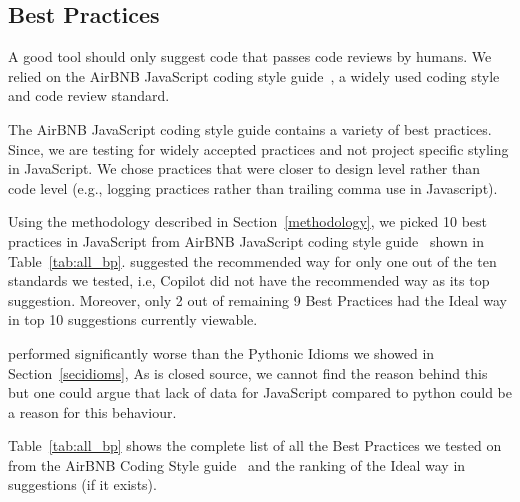 \subsection{Best Practices}
\label{bp}
A good \AISE{} tool should only suggest code that passes code reviews by humans. We relied on the AirBNB JavaScript coding style guide~\cite{airbnb_code}, a widely used coding style and code review standard. 

The AirBNB JavaScript coding style guide contains a variety of best practices. 
Since, we are testing \cop{} for widely accepted practices and not project specific styling in JavaScript. We chose practices that were closer to design level rather than code level (e.g., logging practices rather than trailing comma use in Javascript).

Using the methodology described in Section~\ref{methodology}, we picked 10 best practices in JavaScript from AirBNB JavaScript coding style guide~\cite{airbnb_code} shown in Table~\ref{tab:all_bp}. \cop{} suggested the recommended way for only one out of the ten standards we tested, i.e, Copilot did not have the recommended way as its top suggestion. Moreover, only 2 out of remaining 9 Best Practices had the Ideal way in \cop{} top 10 suggestions currently viewable. 

\cop{} performed significantly worse than the Pythonic Idioms we showed in Section~\ref{secidioms}, As \cop{} is closed source, we cannot find the reason behind this but one could argue that lack of data for JavaScript compared to python could be a reason for this behaviour. 

Table~\ref{tab:all_bp} shows the complete list of all the Best Practices we tested on \cop{} from the AirBNB Coding Style guide~\cite{airbnb_code} and the ranking of the Ideal way in \cop{} suggestions (if it exists).

